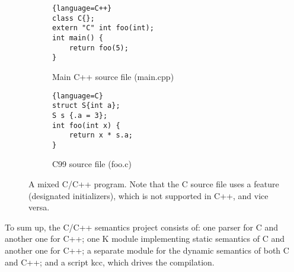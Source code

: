 \documentclass{fithesis3}
\begin{document}


\begin{figure}
\centering
\begin{subfigure}{.5\textwidth}
  \centering

\begin{lstlisting}{language=C++}
class C{};
extern "C" int foo(int);
int main() {
	return foo(5);
}
\end{lstlisting}

  \caption{Main C++ source file (main.cpp)}
\end{subfigure}%
\begin{subfigure}{.5\textwidth}
  \centering
\begin{lstlisting}{language=C}
struct S{int a};
S s {.a = 3};
int foo(int x) {
	return x * s.a;
}
\end{lstlisting}
  \caption{C99 source file (foo.c)}
\end{subfigure}
\caption{A mixed C/C++ program. Note that the C source file uses a feature (designated initializers), which is not supported in C++, and vice versa.}
\label{fig:cpp-program-example}
\end{figure}


To sum up, the C/C++ semantics project consists of: one parser for C and another one for C++; one K module implementing static semantics of C and another one for C++; a separate module for the dynamic semantics of both C and C++; and a script kcc, which drives the compilation.



\end{document}
